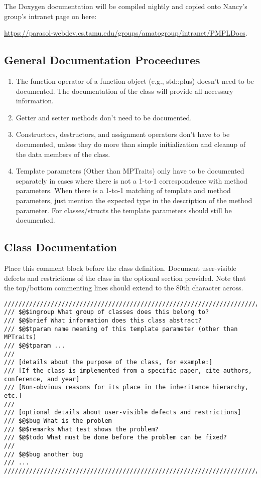 \documentclass[12pt]{article}
\begin{document}
The Doxygen documentation will be compiled nightly and copied onto
Nancy's group's intranet page on here:

\url{https://parasol-webdev.cs.tamu.edu/groups/amatogroup/intranet/PMPLDocs}.

\subsection{General Documentation Proceedures}

\begin{enumerate}
  \item The function operator of a function object (e.g., std::plus) doesn’t
    need to be documented. The documentation of the class will provide all
    necessary information.
  \item Getter and setter methods don’t need to be documented.
  \item Constructors, destructors, and assignment operators don’t have to be
    documented, unless they do more than simple initialization and cleanup of
    the data members of the class.
  \item Template parameters (Other than MPTraits) only have to be documented
    separately in cases where there is not a 1-to-1 correspondence with method
    parameters. When there is a 1-to-1 matching of template and method
    parameters, just mention the expected type in the description of the method
    parameter. For classes/structs the template parameters should still be
    documented.
\end{enumerate}

\subsection{Class Documentation}

Place this comment block before the class definition. Document user-visible
defects and restrictions of the class in the optional section provided. Note
that the top/bottom commenting lines should extend to the 80th character across.

\begin{lstlisting}[mathescape]
///////////////////////////////////////////////////////////////////////////////
/// $@$ingroup What group of classes does this belong to?
/// $@$brief What information does this class abstract?
/// $@$tparam name meaning of this template parameter (other than MPTraits)
/// $@$tparam ...
///
/// [details about the purpose of the class, for example:]
/// [If the class is implemented from a specific paper, cite authors, conference, and year]
/// [Non-obvious reasons for its place in the inheritance hierarchy, etc.]
///
/// [optional details about user-visible defects and restrictions]
/// $@$bug What is the problem
/// $@$remarks What test shows the problem?
/// $@$todo What must be done before the problem can be fixed?
///
/// $@$bug another bug
/// ...
///////////////////////////////////////////////////////////////////////////////
\end{lstlisting}
\end{document}
